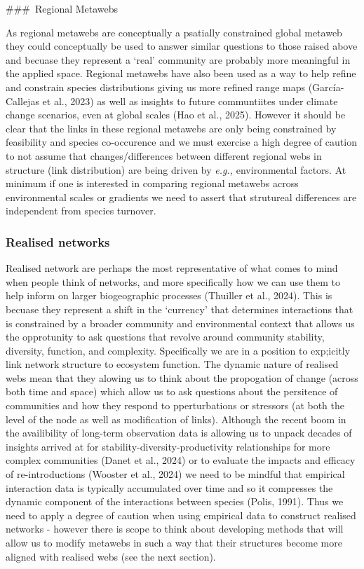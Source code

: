 \documentclass[
]{article}
\begin{document}
\#\#\#~Regional Metawebs

As regional metawebs are conceptually a psatially constrained global
metaweb they could conceptually be used to answer similar questions to
those raised above and becuase they represent a `real' community are
probably more meaningful in the applied space. Regional metawebs have
also been used as a way to help refine and constrain species
distributions giving us more refined range maps (García-Callejas et al.,
2023) as well as insights to future communtiites under climate change
scenarios, even at global scales (Hao et al., 2025). However it should
be clear that the links in these regional metawebs are only being
constrained by feasibility and species co-occurence and we must exercise
a high degree of caution to not assume that changes/differences between
different regional webs in structure (link distribution) are being
driven by \emph{e.g.,} environmental factors. At minimum if one is
interested in comparing regional metawebs across environmental scales or
gradients we need to assert that strutureal differences are independent
from species turnover.

\subsubsection{Realised networks}\label{realised-networks}

Realised network are perhaps the most representative of what comes to
mind when people think of networks, and more specifically how we can use
them to help inform on larger biogeographic processes (Thuiller et al.,
2024). This is becuase they represent a shift in the `currency' that
determines interactions that is constrained by a broader community and
environmental context that allows us the opprotunity to ask questions
that revolve around community stability, diversity, function, and
complexity. Specifically we are in a position to exp;icitly link network
structure to ecosystem function. The dynamic nature of realised webs
mean that they alowing us to think about the propogation of change
(across both time and space) which allow us to ask questions about the
persitence of communities and how they respond to pperturbations or
stressors (at both the level of the node as well as modification of
links). Although the recent boom in the availibility of long-term
observation data is allowing us to unpack decades of insights arrived at
for stability-diversity-productivity relationships for more complex
communities (Danet et al., 2024) or to evaluate the impacts and efficacy
of re-introductions (Wooster et al., 2024) we need to be mindful that
empirical interaction data is typically accumulated over time and so it
compresses the dynamic component of the interactions between species
(Polis, 1991). Thus we need to apply a degree of caution when using
empirical data to construct realised networks - however there is scope
to think about developing methods that will allow us to modify metawebs
in such a way that their structures become more aligned with realised
webs (see the next section).
\end{document}
